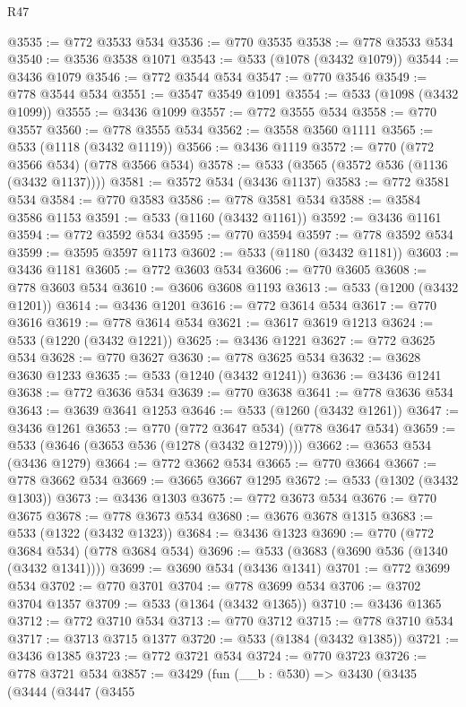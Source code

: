 \begin{lexlean}{R47}
\begin{coremodule}
@3535 := @772 @3533 @534
@3536 := @770 @3535
@3538 := @778 @3533 @534
@3540 := @3536 @3538 @1071
@3543 := @533 (@1078 (@3432 @1079))
@3544 := @3436 @1079
@3546 := @772 @3544 @534
@3547 := @770 @3546
@3549 := @778 @3544 @534
@3551 := @3547 @3549 @1091
@3554 := @533 (@1098 (@3432 @1099))
@3555 := @3436 @1099
@3557 := @772 @3555 @534
@3558 := @770 @3557
@3560 := @778 @3555 @534
@3562 := @3558 @3560 @1111
@3565 := @533 (@1118 (@3432 @1119))
@3566 := @3436 @1119
@3572 := @770 (@772 @3566 @534) (@778 @3566 @534)
@3578 := @533 (@3565 (@3572 @536 (@1136 (@3432 @1137))))
@3581 := @3572 @534 (@3436 @1137)
@3583 := @772 @3581 @534
@3584 := @770 @3583
@3586 := @778 @3581 @534
@3588 := @3584 @3586 @1153
@3591 := @533 (@1160 (@3432 @1161))
@3592 := @3436 @1161
@3594 := @772 @3592 @534
@3595 := @770 @3594
@3597 := @778 @3592 @534
@3599 := @3595 @3597 @1173
@3602 := @533 (@1180 (@3432 @1181))
@3603 := @3436 @1181
@3605 := @772 @3603 @534
@3606 := @770 @3605
@3608 := @778 @3603 @534
@3610 := @3606 @3608 @1193
@3613 := @533 (@1200 (@3432 @1201))
@3614 := @3436 @1201
@3616 := @772 @3614 @534
@3617 := @770 @3616
@3619 := @778 @3614 @534
@3621 := @3617 @3619 @1213
@3624 := @533 (@1220 (@3432 @1221))
@3625 := @3436 @1221
@3627 := @772 @3625 @534
@3628 := @770 @3627
@3630 := @778 @3625 @534
@3632 := @3628 @3630 @1233
@3635 := @533 (@1240 (@3432 @1241))
@3636 := @3436 @1241
@3638 := @772 @3636 @534
@3639 := @770 @3638
@3641 := @778 @3636 @534
@3643 := @3639 @3641 @1253
@3646 := @533 (@1260 (@3432 @1261))
@3647 := @3436 @1261
@3653 := @770 (@772 @3647 @534) (@778 @3647 @534)
@3659 := @533 (@3646 (@3653 @536 (@1278 (@3432 @1279))))
@3662 := @3653 @534 (@3436 @1279)
@3664 := @772 @3662 @534
@3665 := @770 @3664
@3667 := @778 @3662 @534
@3669 := @3665 @3667 @1295
@3672 := @533 (@1302 (@3432 @1303))
@3673 := @3436 @1303
@3675 := @772 @3673 @534
@3676 := @770 @3675
@3678 := @778 @3673 @534
@3680 := @3676 @3678 @1315
@3683 := @533 (@1322 (@3432 @1323))
@3684 := @3436 @1323
@3690 := @770 (@772 @3684 @534) (@778 @3684 @534)
@3696 := @533 (@3683 (@3690 @536 (@1340 (@3432 @1341))))
@3699 := @3690 @534 (@3436 @1341)
@3701 := @772 @3699 @534
@3702 := @770 @3701
@3704 := @778 @3699 @534
@3706 := @3702 @3704 @1357
@3709 := @533 (@1364 (@3432 @1365))
@3710 := @3436 @1365
@3712 := @772 @3710 @534
@3713 := @770 @3712
@3715 := @778 @3710 @534
@3717 := @3713 @3715 @1377
@3720 := @533 (@1384 (@3432 @1385))
@3721 := @3436 @1385
@3723 := @772 @3721 @534
@3724 := @770 @3723
@3726 := @778 @3721 @534
@3857 := @3429
    (fun (__b : @530) =>
    @3430
      (@3435
        (@3444
          (@3447
            (@3455

\end{coremodule}
\end{lexlean}
